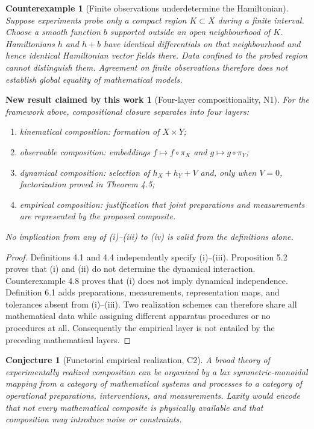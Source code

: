\documentclass[11pt]{article}
\newtheorem{conjecture}[definition]{Conjecture}
\newtheorem{newresult}[definition]{New result claimed by this work}
\newtheorem{counterexample}[definition]{Counterexample}
\begin{document}
\begin{counterexample}[Finite observations underdetermine the Hamiltonian]
Suppose experiments probe only a compact region $K\subset X$ during a finite interval. Choose a smooth function $b$ supported outside an open neighbourhood of $K$. Hamiltonians $h$ and $h+b$ have identical differentials on that neighbourhood and hence identical Hamiltonian vector fields there. Data confined to the probed region cannot distinguish them. Agreement on finite observations therefore does not establish global equality of mathematical models.
\end{counterexample}

\begin{newresult}[Four-layer compositionality, N1]
For the framework above, compositional closure separates into four layers:
\begin{enumerate}[label=(\roman*)]
\item kinematical composition: formation of $X\times Y$;
\item observable composition: embeddings $f\mapsto f\circ\pi_X$ and $g\mapsto g\circ\pi_Y$;
\item dynamical composition: selection of $h_X+h_Y+V$ and, only when $V=0$, factorization proved in Theorem 4.5;
\item empirical composition: justification that joint preparations and measurements are represented by the proposed composite.
\end{enumerate}
No implication from any of (i)--(iii) to (iv) is valid from the definitions alone.
\end{newresult}

\begin{proof}
Definitions 4.1 and 4.4 independently specify (i)--(iii). Proposition 5.2 proves that (i) and (ii) do not determine the dynamical interaction. Counterexample 4.8 proves that (i) does not imply dynamical independence. Definition 6.1 adds preparations, measurements, representation maps, and tolerances absent from (i)--(iii). Two realization schemes can therefore share all mathematical data while assigning different apparatus procedures or no procedures at all. Consequently the empirical layer is not entailed by the preceding mathematical layers.
\end{proof}

\begin{conjecture}[Functorial empirical realization, C2]
A broad theory of experimentally realized composition can be organized by a lax symmetric-monoidal mapping from a category of mathematical systems and processes to a category of operational preparations, interventions, and measurements. Laxity would encode that not every mathematical composite is physically available and that composition may introduce noise or constraints.
\end{conjecture}
\end{document}
